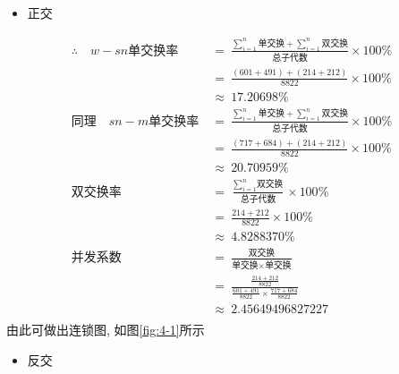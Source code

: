 \documentclass[AutoFakeBold]{LZUThesis}
\begin{document}
\begin{itemize}
    \item 正交
\end{itemize}

\begin{align*}
    \therefore \quad w - sn \text{单交换率} ~ & = ~ \frac{\sum\limits_{i=1}^{n}\text{单交换} + \sum\limits_{i=1}^{n}\text{双交换}}{\text{总子代数}} \times 100 \% \\[10pt]
    & = ~ \frac{ (601 + 491) + (214 + 212) }{8822} \times 100 \% \\[10pt]
    & \approx ~ 17.20698 \%  \\[10pt]
    \text{同理} \quad sn - m \text{单交换率} ~ & = ~ \frac{\sum\limits_{i=1}^{n}\text{单交换} + \sum\limits_{i=1}^{n}\text{双交换}}{\text{总子代数}} \times 100 \% \\[10pt]
    & = ~ \frac{ (717 + 684) + (214 + 212) }{8822} \times 100 \% \\[10pt]
    & \approx ~ 20.70959 \%  \\[10pt]
    \text{双交换率} ~ & = ~ \frac{\sum\limits_{i=1}^{n}\text{双交换}}{\text{总子代数}} \times 100 \% \\[10pt]
    & = ~ \frac{ 214 + 212 }{8822} \times 100 \% \\[10pt]
    & \approx ~ 4.8288370 \%  \\[10pt]
    \text{并发系数} ~ & = ~ \frac{\text{双交换}}{\text{单交换} \times \text{单交换}} \\[10pt]
    & = ~ \frac{ \frac{214 + 212}{8822} }{\frac{601 + 491}{8822} \times \frac{717 + 684}{8822}} \\[10pt]
    & \approx ~ 2.45649496827227 \\[10pt]
\end{align*}
\hspace{4em}由此可做出连锁图, 如图\ref{fig:4-1}所示

\begin{itemize}
    \item 反交
\end{itemize}
\end{document}
